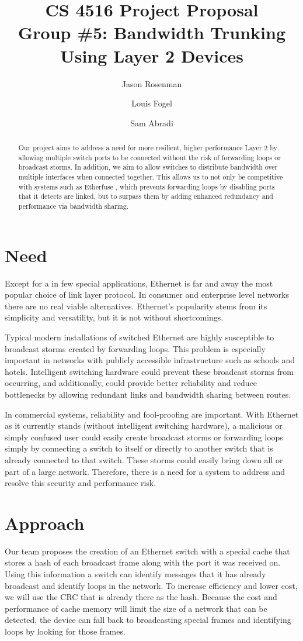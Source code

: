 \documentclass{article}
\title{CS 4516 Project Proposal\\Group \#5: Bandwidth Trunking Using Layer 2 Devices}
\author{Jason Rosenman \and Louis Fogel \and Sam Abradi}
\date{}
\begin{document}
\maketitle
\begin{abstract}
	Our project aims to address a need for more resilient, higher performance Layer 2 by allowing multiple switch ports to be connected without the risk of forwarding loops or broadcast storms.
	In addition, we aim to allow switches to distribute bandwidth over multiple interfaces when connected together.
	This allows us to not only be competitive with systems such as Etherfuse \cite{etherfuse}, which prevents forwarding loops by disabling ports that it detects are linked, but to surpass them by adding enhanced redundancy and performance via bandwidth sharing.
\end{abstract}
\section{Need}
	Except for a in few special applications, Ethernet is far and away the most popular choice of link layer protocol.
	In consumer and enterprise level networks there are no real viable alternatives.
	Ethernet’s popularity stems from its simplicity and versatility, but it is not without shortcomings.

	Typical modern installations of switched Ethernet are highly susceptible to broadcast storms created by forwarding loops.
	This problem is especially important in networks with publicly accessible infrastructure such as schools and hotels.
	Intelligent switching hardware could prevent these broadcast storms from occurring, and additionally, could provide better reliability and reduce bottlenecks by allowing redundant links and bandwidth sharing between routes.
	
	In commercial systems, reliability and fool-proofing are important.
	With Ethernet as it currently stands (without intelligent switching hardware), a malicious or simply confused user could easily create broadcast storms or forwarding loops simply by connecting a switch to itself or directly to another switch that is already connected to that switch.
	These storms could easily bring down all or part of a large network.
	Therefore, there is a need for a system to address and resolve this security and performance risk.
\section{Approach}
	Our team proposes the creation of an Ethernet switch with a special cache that stores a hash of each broadcast frame along with the port it was received on.
	Using this information a switch can identify messages that it has already broadcast and identify loops in the network.
	To increase efficiency and lower cost, we will use the CRC that is already there as the hash.
	Because the cost and performance of cache memory will limit the size of a network that can be detected, the device can fall back to broadcasting special frames and identifying loops by looking for those frames.
\end{document}

